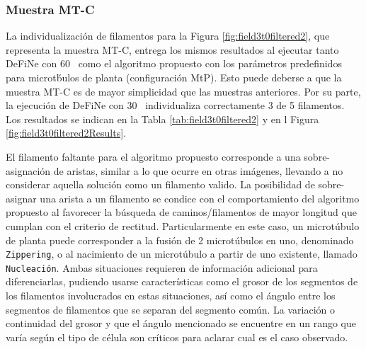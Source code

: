 \subsubsection{Muestra MT-C}
La individualizaci\'on de filamentos para la Figura \ref{fig:field3t0filtered2}, que representa la muestra MT-C, entrega los mismos resultados al ejecutar tanto DeFiNe con 60\textdegree~ como el algoritmo propuesto con los par\'ametros predefinidos para microt\'bulos de planta (configuraci\'on MtP). Esto puede deberse a que la muestra MT-C es de mayor simplicidad que las muestras anteriores. Por su parte, la ejecuci\'on de DeFiNe con 30\textdegree~ individualiza correctamente 3 de 5 filamentos. Los resultados se indican en la Tabla \ref{tab:field3t0filtered2} y en l Figura \ref{fig:field3t0filtered2Results}.



El filamento faltante para el algoritmo propuesto corresponde a una sobre-asignaci\'on de aristas, similar a lo que ocurre en otras im\'agenes, llevando a no considerar aquella soluci\'on como un filamento valido. La posibilidad de sobre-asignar una arista a un filamento se condice con el comportamiento del algoritmo propuesto al favorecer la b\'usqueda de caminos/filamentos de mayor longitud que cumplan con el criterio de rectitud. Particularmente en este caso, un microt\'ubulo de planta puede corresponder a la fusi\'on de 2 microt\'ubulos en uno, denominado {\tt Zippering}, o al nacimiento de un microt\'ubulo a partir de uno existente, llamado {\tt Nucleaci\'on}. Ambas situaciones requieren de informaci\'on adicional para diferenciarlas, pudiendo usarse caracter\'isticas como el grosor de los segmentos de los filamentos involucrados en estas situaciones, as\'i como el \'angulo entre los segmentos de filamentos que se separan del segmento com\'un. La variaci\'on o continuidad del grosor y que el \'angulo mencionado se encuentre en un rango que var\'ia seg\'un el tipo de c\'elula son cr\'iticos para aclarar cual es el caso observado. 



